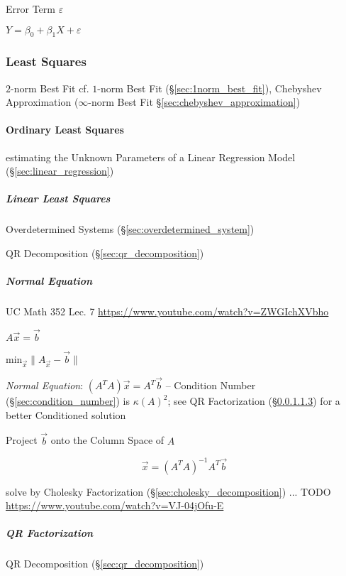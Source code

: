 Error Term $\varepsilon$

$Y = \beta_0 + \beta_1 X + \varepsilon$



\subsubsection{Least Squares}\label{sec:least_squares}

$2$-norm Best Fit \fist cf. $1$-norm Best Fit (\S\ref{sec:1norm_best_fit}),
Chebyshev Approximation ($\infty$-norm Best Fit
\S\ref{sec:chebyshev_approximation})



\paragraph{Ordinary Least Squares}\label{sec:ordinary_least_squares}\hfill

estimating the Unknown Parameters of a Linear Regression Model
(\S\ref{sec:linear_regression})



\subparagraph{Linear Least Squares}\label{sec:linear_least_squares}\hfill

Overdetermined Systems (\S\ref{sec:overdetermined_system})

QR Decomposition (\S\ref{sec:qr_decomposition})



\subparagraph{Normal Equation}\label{sec:normal_equation}\hfill

UC Math 352 Lec. 7 \url{https://www.youtube.com/watch?v=ZWGIchXVbho}

$A\vec{x} = \vec{b}$

$\mathrm{min}_{\vec{x}} \|A_{\vec{x}} - \vec{b}\|$

\emph{Normal Equation}: $(A^TA)\vec{x} = A^T\vec{b}$ -- Condition Number
(\S\ref{sec:condition_number}) is $\kappa(A)^2$; see QR Factorization
(\S\ref{sec:qr_factorization}) for a better Conditioned solution

Project $\vec{b}$ onto the Column Space of $A$

\[
  \vec{x} = (A^TA)^{-1}A^T\vec{b}
\]

solve by Cholesky Factorization (\S\ref{sec:cholesky_decomposition}) ... TODO
\url{https://www.youtube.com/watch?v=VJ-04jOfu-E}



\subparagraph{QR Factorization}\label{sec:qr_factorization}\hfill

QR Decomposition (\S\ref{sec:qr_decomposition})

